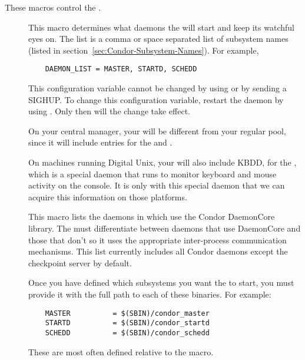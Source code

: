 These macros control the .
\begin{description}
  
\item[] \label{param:DaemonList} This macro
  determines what daemons the  will start and keep its
  watchful eyes on.  The list is a comma or space separated list of
  subsystem names (listed in
  section~\ref{sec:Condor-Subsystem-Names}).  For example,
  \begin{verbatim}
    DAEMON_LIST = MASTER, STARTD, SCHEDD
  \end{verbatim}

  \Note This configuration variable cannot be changed 
  by using  or 
  by sending a SIGHUP.
  To change this configuration variable, restart the
   daemon
  by using .
  Only then will the change take effect.

  \Note On your central manager, your 
  will be different from your regular pool, since it will include
  entries for the  and .  
  
  \Note On machines running Digital Unix, your
   will also include KBDD, for the
  , which is a special daemon that runs to monitor
  keyboard and mouse activity on the console.  It is only with this
  special daemon that we can acquire this information on those
  platforms. 

\item[] \label{param:DCDaemonList} This macro
  lists the daemons in  which use the Condor
  DaemonCore library.  The  must differentiate between
  daemons that use DaemonCore and those that don't so it uses the
  appropriate inter-process communication mechanisms.  This list
  currently includes all Condor daemons except the checkpoint server
  by default.
  
\item[] \label{param:SUBSYS}
  Once you have defined which
  subsystems you want the  to start, you must provide
  it with the full path to each of these binaries.  For example:
  \begin{verbatim}
    MASTER          = $(SBIN)/condor_master
    STARTD          = $(SBIN)/condor_startd
    SCHEDD          = $(SBIN)/condor_schedd
  \end{verbatim}
  These are most often defined relative to the  macro.


\end{description}
